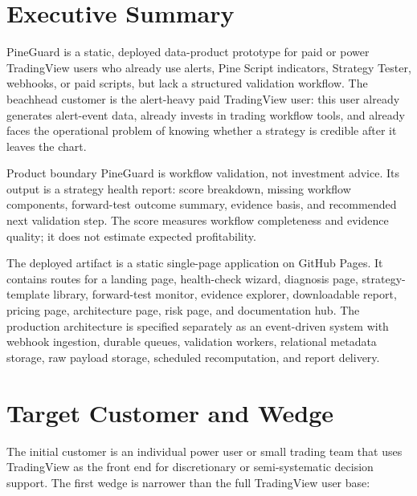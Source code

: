 \documentclass[11pt,a4paper]{article}
\begin{document}
\tableofcontents
\newpage

\section{Executive Summary}

PineGuard is a static, deployed data-product prototype for paid or power TradingView users who already use alerts, Pine Script indicators, Strategy Tester, webhooks, or paid scripts, but lack a structured validation workflow. The beachhead customer is the alert-heavy paid TradingView user: this user already generates alert-event data, already invests in trading workflow tools, and already faces the operational problem of knowing whether a strategy is credible after it leaves the chart.

\begin{keybox}{Product boundary}
PineGuard is workflow validation, not investment advice. Its output is a strategy health report: score breakdown, missing workflow components, forward-test outcome summary, evidence basis, and recommended next validation step. The score measures workflow completeness and evidence quality; it does not estimate expected profitability.
\end{keybox}

The deployed artifact is a static single-page application on GitHub Pages. It contains routes for a landing page, health-check wizard, diagnosis page, strategy-template library, forward-test monitor, evidence explorer, downloadable report, pricing page, architecture page, risk page, and documentation hub. The production architecture is specified separately as an event-driven system with webhook ingestion, durable queues, validation workers, relational metadata storage, raw payload storage, scheduled recomputation, and report delivery.

\section{Target Customer and Wedge}

The initial customer is an individual power user or small trading team that uses TradingView as the front end for discretionary or semi-systematic decision support. The first wedge is narrower than the full TradingView user base:
\end{document}
